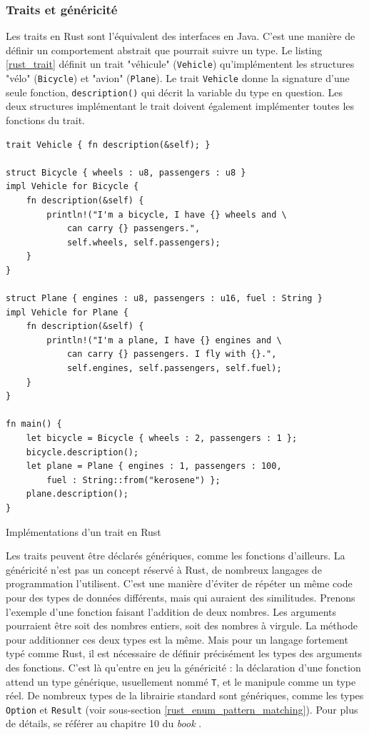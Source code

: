 \documentclass[a4paper, 12pt]{article}
\newenvironment{code}{\captionsetup{type=listing}}{}
\begin{document}
\subsubsection{Traits et généricité}\label{trait_generic}
Les traits en Rust sont l'équivalent des interfaces en Java. C'est une manière de définir 
un comportement abstrait que pourrait suivre un type. Le listing \ref{rust_trait} définit 
un trait "véhicule" (\texttt{Vehicle}) qu'implémentent les structures "vélo" 
(\texttt{Bicycle}) et "avion" (\texttt{Plane}). Le trait 
\texttt{Vehicle} donne la signature d'une seule fonction, \texttt{description()} 
qui décrit la variable du type en question. Les deux structures implémentant le trait doivent également 
implémenter toutes les fonctions du trait.
\bigbreak
\begin{code}
    \begin{verbatim}
trait Vehicle { fn description(&self); }

struct Bicycle { wheels : u8, passengers : u8 }
impl Vehicle for Bicycle {
    fn description(&self) {
        println!("I'm a bicycle, I have {} wheels and \
            can carry {} passengers.", 
            self.wheels, self.passengers);
    }
}

struct Plane { engines : u8, passengers : u16, fuel : String }
impl Vehicle for Plane {
    fn description(&self) {
        println!("I'm a plane, I have {} engines and \
            can carry {} passengers. I fly with {}.", 
            self.engines, self.passengers, self.fuel);
    }
}

fn main() {
    let bicycle = Bicycle { wheels : 2, passengers : 1 };
    bicycle.description();
    let plane = Plane { engines : 1, passengers : 100, 
        fuel : String::from("kerosene") };
    plane.description();
}
    \end{verbatim}
    \caption{Implémentations d'un trait en Rust}
    \label{rust_trait}
\end{code}
\bigbreak
Les traits peuvent être déclarés génériques, comme les fonctions d'ailleurs. La généricité 
n'est pas un concept réservé à Rust, de nombreux langages de programmation l'utilisent. C'est une 
manière d'éviter de répéter un même code pour des types de données différents, mais qui auraient 
des similitudes. Prenons l'exemple d'une fonction faisant l'addition de deux nombres. Les arguments 
pourraient être soit des nombres entiers, soit des nombres à virgule. La méthode pour additionner 
ces deux types est la même. Mais pour un langage fortement typé comme Rust, il est nécessaire de 
définir précisément les types des arguments des fonctions. C'est là qu'entre en jeu la généricité : 
la déclaration d'une fonction attend un type générique, usuellement nommé \texttt{T}, 
et le manipule comme un type réel. De nombreux types de la librairie standard sont génériques, 
comme les types \texttt{Option} et \texttt{Result} (voir sous-section 
\ref{rust_enum_pattern_matching}).
Pour plus de détails, se référer au chapitre 10 du \textit{book} \cite{ref0}.
\end{document}
